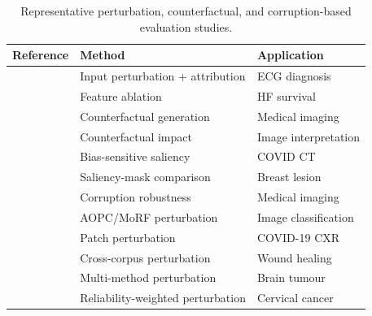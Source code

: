 \begin{table}[htbp]
\centering
\caption{Representative perturbation, counterfactual, and corruption-based evaluation studies.}
\label{tab:perturbation_methods}
\small
\begin{tabularx}{\columnwidth}{@{}p{1.8cm}XX@{}}
\toprule
\textbf{Reference} & \textbf{Method} & \textbf{Application} \\
\midrule
\cite{Zhang2021} & Input perturbation + attribution & ECG diagnosis \\
\cite{MorenoSanchez2023} & Feature ablation & HF survival \\
\cite{singla2023explaining} & Counterfactual generation & Medical imaging \\
\cite{lenis2020domain} & Counterfactual impact & Image interpretation \\
\cite{palatnik2021xai} & Bias-sensitive saliency & COVID CT \\
\cite{Pertuz2023} & Saliency-mask comparison & Breast lesion \\
\cite{Repetto2025EvaluatingTR} & Corruption robustness & Medical imaging \\
\cite{Patricio2024} & AOPC/MoRF perturbation & Image classification \\
\cite{sun2023improving} & Patch perturbation & COVID-19 CXR \\
\cite{jacob2025indian} & Cross-corpus perturbation & Wound healing \\
\cite{akgundougdu2025explainable} & Multi-method perturbation & Brain tumour \\
\cite{alpsalaz2026explainability} & Reliability-weighted perturbation & Cervical cancer \\
\bottomrule
\end{tabularx}
\end{table}
